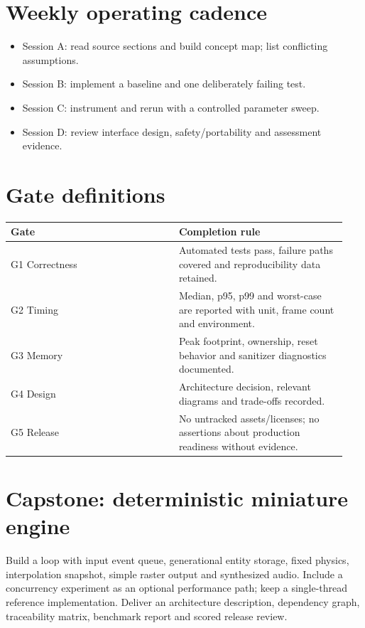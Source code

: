 \documentclass[11pt,letterpaper]{article}
\begin{document}
\section{Weekly operating cadence}
\begin{itemize}
\item Session A: read source sections and build concept map; list conflicting assumptions.
\item Session B: implement a baseline and one deliberately failing test.
\item Session C: instrument and rerun with a controlled parameter sweep.
\item Session D: review interface design, safety/portability and assessment evidence.
\end{itemize}
\section{Gate definitions}
\small\begin{longtable}{|p{0.47\linewidth}|p{0.47\linewidth}|}
\hline \textbf{Gate} & \textbf{Completion rule}\\ \hline\endhead
G1 Correctness & Automated tests pass, failure paths covered and reproducibility data retained.\\ \hline
G2 Timing & Median, p95, p99 and worst-case are reported with unit, frame count and environment.\\ \hline
G3 Memory & Peak footprint, ownership, reset behavior and sanitizer diagnostics documented.\\ \hline
G4 Design & Architecture decision, relevant diagrams and trade-offs recorded.\\ \hline
G5 Release & No untracked assets/licenses; no assertions about production readiness without evidence.\\ \hline
\end{longtable}\normalsize
\section{Capstone: deterministic miniature engine}
Build a loop with input event queue, generational entity storage, fixed physics, interpolation snapshot, simple raster output and synthesized audio. Include a concurrency experiment as an optional performance path; keep a single-thread reference implementation. Deliver an architecture description, dependency graph, traceability matrix, benchmark report and scored release review.
\end{document}
